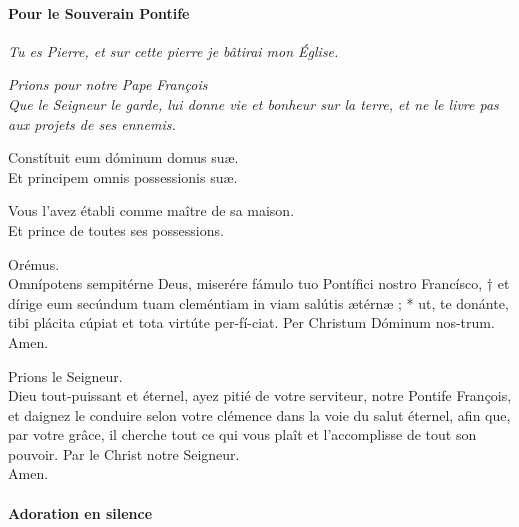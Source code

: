 \documentclass[twoside]{article}
\begin{document}
\paragraph{Pour le Souverain Pontife}


\emph{Tu es Pierre, et sur cette pierre je bâtirai mon Église.}


\emph{\vv Prions pour notre Pape François\\
\rr Que le Seigneur le garde, lui donne vie et bonheur sur la terre, et ne le livre pas aux projets de ses ennemis.}

\begin{paracol}{2}

\vv Constítuit eum dóminum domus suæ.\\
\rr Et principem omnis possessionis suæ.

\switchcolumn

\vv Vous l’avez établi comme maître de sa maison.\\
\rr Et prince de toutes ses possessions.

\switchcolumn*

\vv Orémus.\\
Omnípotens sempitérne Deus, miserére fámulo tuo Pontífici nostro Francísco, † et dírige
eum secúndum tuam cleméntiam in viam salútis ætérnæ ; * ut, te donánte, tibi plácita
cúpiat et tota virtúte per-fí-ciat.
Per Christum Dóminum nos-trum. \\
\rr Amen.

\switchcolumn

\vv Prions le Seigneur.\\
Dieu tout-puissant et éternel, ayez pitié de votre serviteur, notre Pontife François, et daignez le conduire selon votre clémence dans la voie du salut
éternel, afin que, par votre grâce, il cherche tout ce
qui vous plaît et l’accomplisse de tout son pouvoir.
Par le Christ notre Seigneur.\\
\rr Amen.

\end{paracol}

\paragraph{Adoration en silence}

\end{document}
